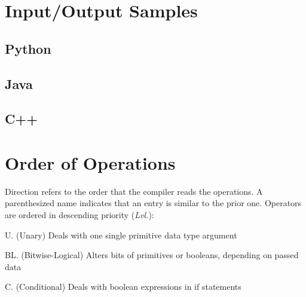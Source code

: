 \documentclass{article}
\begin{document}
\setlength{\tabcolsep}{1pt}
\renewcommand{\arraystretch}{1}
\section{Input/Output Samples}
\subsection{Python}

\subsection{Java}

\subsection{C++}


\section{Order of Operations} 
Direction refers to the order that the compiler reads the operations.
A parenthesized name indicates that an entry is similar to the prior one.
Operators are ordered in descending priority (\textit{Lvl.}):

U. (Unary) \dotfill Deals with one single primitive data type argument

BL. (Bitwise-Logical) \dotfill Alters bits of primitives or booleans, depending on passed data

C. (Conditional) \dotfill Deals with boolean expressions in if statements
\end{document}

